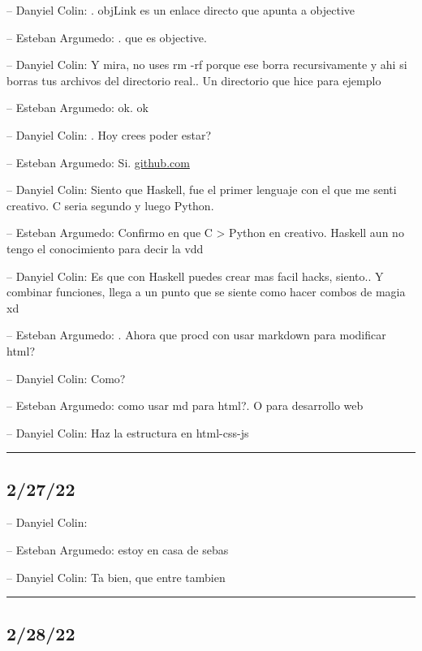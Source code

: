 -- Danyiel Colin: . objLink es un enlace directo que apunta a objective

-- Esteban Argumedo: . que es objective.

-- Danyiel Colin: Y mira, no uses rm -rf porque ese borra recursivamente
y ahi si borras tus archivos del directorio real.. Un directorio que
hice para ejemplo

-- Esteban Argumedo: ok. ok

-- Danyiel Colin: . Hoy crees poder estar?

-- Esteban Argumedo: Si.
\href{https://github.com/nmayur/File-structure}{github.com}

-- Danyiel Colin: Siento que Haskell, fue el primer lenguaje con el que
me senti creativo. C seria segundo y luego Python.

-- Esteban Argumedo: Confirmo en que C \textgreater{} Python en
creativo. Haskell aun no tengo el conocimiento para decir la vdd

-- Danyiel Colin: Es que con Haskell puedes crear mas facil hacks,
siento.. Y combinar funciones, llega a un punto que se siente como hacer
combos de magia xd

-- Esteban Argumedo: . Ahora que procd con usar markdown para modificar
html?

-- Danyiel Colin: Como?

-- Esteban Argumedo: como usar md para html?. O para desarrollo web

-- Danyiel Colin: Haz la estructura en html-css-js

\begin{center}\rule{0.5\linewidth}{0.5pt}\end{center}

\hypertarget{section-19}{%
\subsection{2/27/22}\label{section-19}}

-- Danyiel Colin:

-- Esteban Argumedo: estoy en casa de sebas

-- Danyiel Colin: Ta bien, que entre tambien

\begin{center}\rule{0.5\linewidth}{0.5pt}\end{center}

\hypertarget{section-20}{%
\subsection{2/28/22}\label{section-20}}

